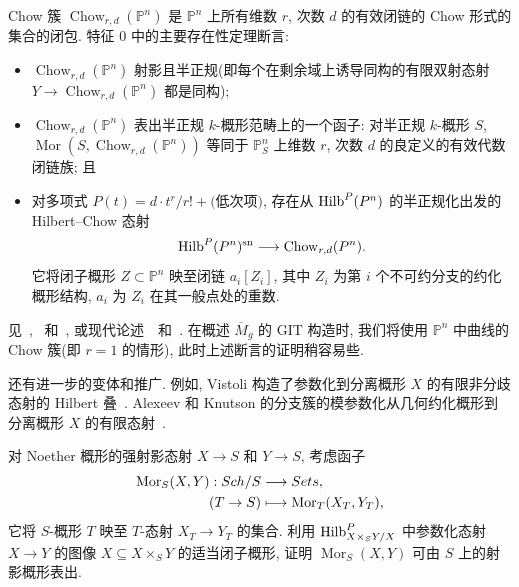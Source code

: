 Chow 簇 $\operatorname{Chow}_{r,d}(\mathbb P^n)$ 是 $\mathbb P^n$ 上所有维数 $r$, 次数 $d$ 的有效闭链的 Chow 形式的集合的闭包.
特征 $0$ 中的主要存在性定理断言: 
\begin{itemize}
\item $\operatorname{Chow}_{r,d}(\mathbb P^n)$ 射影且半正规(即每个在剩余域上诱导同构的有限双射态射 $Y\to\operatorname{Chow}_{r,d}(\mathbb P^n)$ 都是同构); 
\item $\operatorname{Chow}_{r,d}(\mathbb P^n)$ 表出半正规 $k$-概形范畴上的一个函子: 
对半正规 $k$-概形 $S$, $\operatorname{Mor}(S,\operatorname{Chow}_{r,d}(\mathbb P^n))$ 等同于 $\mathbb P_S^n$ 上维数 $r$, 次数 $d$ 的良定义的有效代数闭链族; 且
\item 对多项式 $P(t)=d\cdot t^r/r!+\text{(低次项)}$, 存在从 $\operatorname{Hilb}^P(P^n)$ 的半正规化出发的 Hilbert--Chow 态射
\[
\operatorname{Hilb}^P(P^n)^{\mathrm{sn}}
\longrightarrow\operatorname{Chow}_{r,d}(P^n).
\]
它将闭子概形 $Z\subset\mathbb P^n$ 映至闭链 $a_i[Z_i]$, 其中 $Z_i$ 为第 $i$ 个不可约分支的约化概形结构, $a_i$ 为 $Z_i$ 在其一般点处的重数.
\end{itemize}
见~\cite{CW37}, \cite[\S X.6--8]{HP47}~和~\cite{Sam55}, 或现代论述~\cite[\S$5.4$]{GIT}~和~\cite[I.3.21, I.6.1]{Kol96}.
在概述 $\overline M_g$ 的 GIT 构造时, 我们将使用 $\mathbb P^n$ 中曲线的 Chow 簇(即 $r=1$ 的情形), 此时上述断言的证明稍容易些.
\begin{example}[更多变体]\label{src:2.4.12}
还有进一步的变体和推广.
例如, Vistoli 构造了参数化到分离概形 $X$ 的有限非分歧态射的 Hilbert 叠~\cite{Vis91}.
Alexeev 和 Knutson 的分支簇的模参数化从几何约化概形到分离概形 $X$ 的有限态射~\cite{AK10}.
\end{example}
\begin{exercise}[态射概形]\label{src:2.4.13}
对 Noether 概形的强射影态射 $X\to S$ 和 $Y\to S$, 考虑函子
\[
\begin{aligned}
\operatorname{Mor}_S(X,Y):Sch/S&\longrightarrow Sets,\\
(T\to S)&\longmapsto\operatorname{Mor}_T(X_T,Y_T),
\end{aligned}
\]
它将 $S$-概形 $T$ 映至 $T$-态射 $X_T\to Y_T$ 的集合.
利用 $\operatorname{Hilb}^P_{X\times_SY/X}$ 中参数化态射 $X\to Y$ 的图像 $X\subseteq X\times_SY$ 的适当闭子概形, 证明 $\operatorname{Mor}_S(X,Y)$ 可由 $S$ 上的射影概形表出.
\end{exercise}
